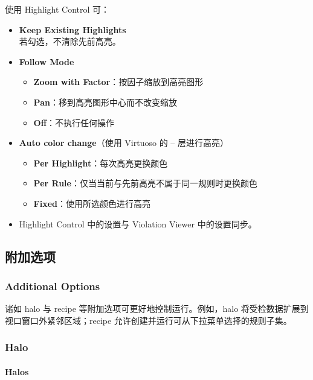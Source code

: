 使用 Highlight Control 可：
\begin{itemize}
  \item \textbf{Keep Existing Highlights}\\
  若勾选，不清除先前高亮。
  \item \textbf{Follow Mode}
  \begin{itemize}
    \item \textbf{Zoom with Factor}：按因子缩放到高亮图形
    \item \textbf{Pan}：移到高亮图形中心而不改变缩放
    \item \textbf{Off}：不执行任何操作
  \end{itemize}
  \item \textbf{Auto color change}（使用 Virtuoso 的 -- 层进行高亮）
  \begin{itemize}
    \item \textbf{Per Highlight}：每次高亮更换颜色
    \item \textbf{Per Rule}：仅当当前与先前高亮不属于同一规则时更换颜色
    \item \textbf{Fixed}：使用所选颜色进行高亮
  \end{itemize}
  \item Highlight Control 中的设置与 Violation Viewer 中的设置同步。
\end{itemize}


\subsection{附加选项}
\subsubsection*{Additional Options}

诸如 halo 与 recipe 等附加选项可更好地控制运行。例如，halo 将受检数据扩展到视口窗口外紧邻区域；recipe 允许创建并运行可从下拉菜单选择的规则子集。

\subsubsection{Halo}
\paragraph*{Halos}

